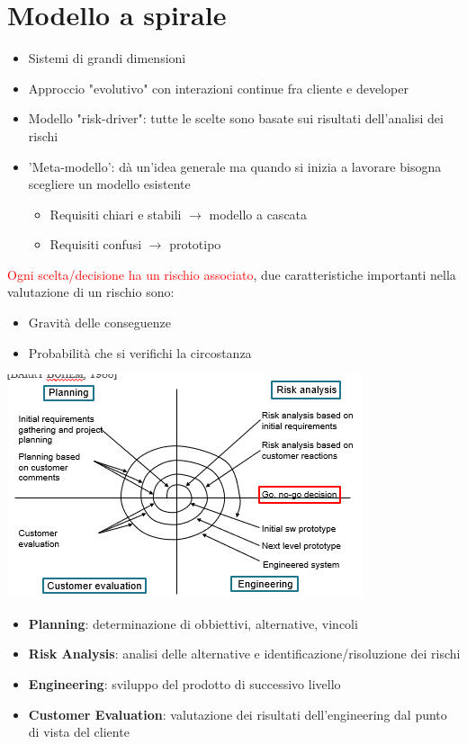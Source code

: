 \documentclass[12pt, a4paper]{report}
\begin{document}
\section{Modello a spirale}
\begin{itemize}
    \item Sistemi di grandi dimensioni
    \item Approccio "evolutivo" con interazioni continue fra cliente e developer
    \item Modello "risk-driver": tutte le scelte sono basate sui risultati dell'analisi dei rischi
    \item 'Meta-modello': dà un'idea generale ma quando si inizia a lavorare bisogna scegliere un modello esistente \begin{itemize}
        \item Requisiti chiari e stabili $\rightarrow$ modello a cascata
        \item Requisiti confusi $\rightarrow$ prototipo
    \end{itemize}
\end{itemize}
\textcolor{red}{Ogni scelta/decisione ha un rischio associato}, due caratteristiche importanti nella valutazione di un rischio sono: \begin{itemize}
    \item Gravità delle conseguenze
    \item Probabilità che si verifichi la circostanza
\end{itemize}
\begin{center}
    \includegraphics[width=0.7\linewidth]{Immagini/spirale.png}
\end{center}
\begin{itemize}
    \item \textbf{Planning}: determinazione di obbiettivi, alternative, vincoli
    \item \textbf{Risk Analysis}: analisi delle alternative e identificazione/risoluzione dei rischi
    \item \textbf{Engineering}: sviluppo del prodotto di successivo livello
    \item \textbf{Customer Evaluation}: valutazione dei risultati dell'engineering dal punto di vista del cliente
\end{itemize}
\end{document}

